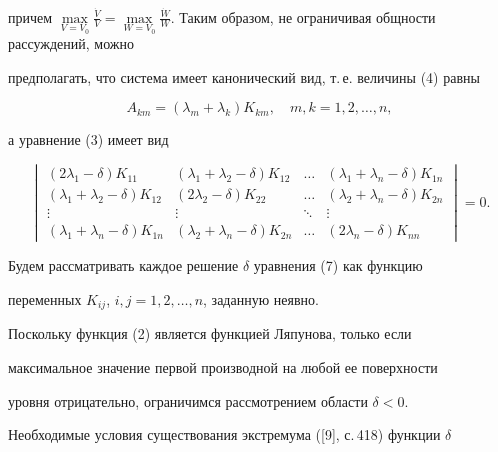 \begin{pf}
\begin{align*}
\end{align*}


причем $\max\limits_{V=V_{0}}\frac {\Dot V}{V}=\max\limits_{W=V_{0}}


\frac {\Dot W}{W}$. Таким образом, не ограничивая общности рассуждений, можно


предполагать, что система имеет канонический вид, т.\,е. величины (4) равны


$$


A_{km}=(\lambda_{m}+\lambda_{k})K_{km},\quad m,k=1,2,\dotsc,n,


$$


а уравнение (3) имеет вид


\begin{equation}


\begin{vmatrix}


(2\lambda_{1}-\delta )K_{11} & (\lambda_{1}+\lambda_{2}-\delta )K_{12} &


\dotsc & (\lambda_{1}+\lambda_{n}-\delta )K_{1n} \\


(\lambda_{1}+\lambda_{2}-\delta )K_{12} & (2\lambda_{2}-\delta )K_{22} &


\dotsc & (\lambda_{2}+\lambda_{n}-\delta )K_{2n} \\


\vdots  &  \vdots & \ddots &  \vdots   \\


(\lambda_{1}+\lambda_{n}-\delta )K_{1n} &


(\lambda_{2}+\lambda_{n}-\delta )K_{2n} &


 \dotsc & (2\lambda_{n}-\delta )K_{nn}


\end{vmatrix} =0.


\end{equation}





Будем рассматривать каждое решение $\delta$ уравнения (7) как функцию


переменных $K_{ij}$, $i,j=1,2,\dotsc,n$, заданную неявно.


Поскольку функция (2) является функцией Ляпунова, только если


максимальное значение первой производной на любой ее поверхности


уровня отрицательно, ограничимся рассмотрением области $\delta <0$.


Необходимые условия существования экстремума ([9], с.\,418) функции $\delta$



\end{pf}
